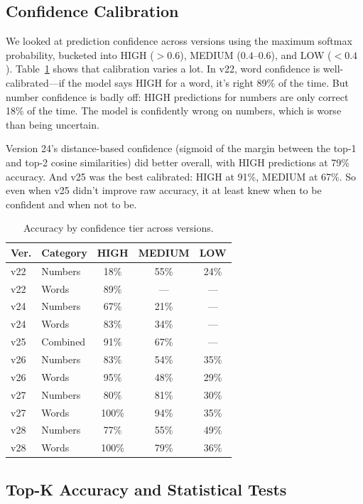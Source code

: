 \documentclass[conference]{IEEEtran}
\begin{document}
\subsection{Confidence Calibration}

We looked at prediction confidence across versions using the maximum softmax probability, bucketed into HIGH ($>0.6$), MEDIUM ($0.4$--$0.6$), and LOW ($<0.4$). Table~\ref{tab:confidence} shows that calibration varies a lot. In v22, word confidence is well-calibrated---if the model says HIGH for a word, it's right 89\% of the time. But number confidence is badly off: HIGH predictions for numbers are only correct 18\% of the time. The model is confidently wrong on numbers, which is worse than being uncertain.

Version 24's distance-based confidence (sigmoid of the margin between the top-1 and top-2 cosine similarities) did better overall, with HIGH predictions at 79\% accuracy. And v25 was the best calibrated: HIGH at 91\%, MEDIUM at 67\%. So even when v25 didn't improve raw accuracy, it at least knew when to be confident and when not to be.

\begin{table}[t]
\centering
\caption{Accuracy by confidence tier across versions.}
\label{tab:confidence}
\small
\begin{tabular}{@{}llccc@{}}
\toprule
\textbf{Ver.} & \textbf{Category} & \textbf{HIGH} & \textbf{MEDIUM} & \textbf{LOW} \\
\midrule
v22 & Numbers & 18\% & 55\% & 24\% \\
v22 & Words & 89\% & --- & --- \\
v24 & Numbers & 67\% & 21\% & --- \\
v24 & Words & 83\% & 34\% & --- \\
v25 & Combined & 91\% & 67\% & --- \\
v26 & Numbers & 83\% & 54\% & 35\% \\
v26 & Words & 95\% & 48\% & 29\% \\
v27 & Numbers & 80\% & 81\% & 30\% \\
v27 & Words & 100\% & 94\% & 35\% \\
v28 & Numbers & 77\% & 55\% & 49\% \\
v28 & Words & 100\% & 79\% & 36\% \\
\bottomrule
\end{tabular}
\end{table}

\subsection{Top-K Accuracy and Statistical Tests}
\end{document}
